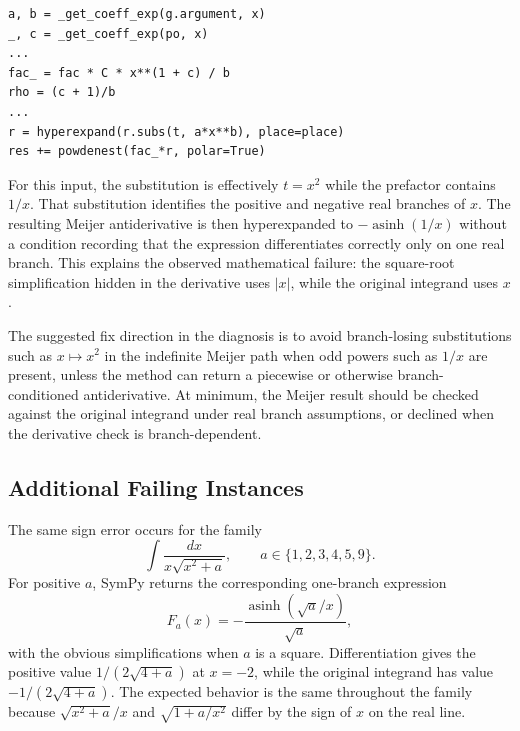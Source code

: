 \documentclass[11pt]{article}
\begin{document}
\begin{lstlisting}[style=bugpython]
a, b = _get_coeff_exp(g.argument, x)
_, c = _get_coeff_exp(po, x)
...
fac_ = fac * C * x**(1 + c) / b
rho = (c + 1)/b
...
r = hyperexpand(r.subs(t, a*x**b), place=place)
res += powdenest(fac_*r, polar=True)
\end{lstlisting}

For this input, the substitution is effectively \(t=x^2\) while the prefactor contains \(1/x\). That substitution identifies the positive and negative real branches of \(x\). The resulting Meijer antiderivative is then hyperexpanded to \(-\operatorname{asinh}(1/x)\) without a condition recording that the expression differentiates correctly only on one real branch. This explains the observed mathematical failure: the square-root simplification hidden in the derivative uses \(|x|\), while the original integrand uses \(x\).

The suggested fix direction in the diagnosis is to avoid branch-losing substitutions such as \(x\mapsto x^2\) in the indefinite Meijer path when odd powers such as \(1/x\) are present, unless the method can return a piecewise or otherwise branch-conditioned antiderivative. At minimum, the Meijer result should be checked against the original integrand under real branch assumptions, or declined when the derivative check is branch-dependent.

\subsection{Additional Failing Instances}

The same sign error occurs for the family
\[
  \int \frac{dx}{x\sqrt{x^2+a}},
  \qquad a\in\{1,2,3,4,5,9\}.
\]
For positive \(a\), SymPy returns the corresponding one-branch expression
\[
  F_a(x)=-\frac{\operatorname{asinh}(\sqrt{a}/x)}{\sqrt{a}},
\]
with the obvious simplifications when \(a\) is a square. Differentiation gives the positive value \(1/(2\sqrt{4+a})\) at \(x=-2\), while the original integrand has value \(-1/(2\sqrt{4+a})\). The expected behavior is the same throughout the family because \(\sqrt{x^2+a}/x\) and \(\sqrt{1+a/x^2}\) differ by the sign of \(x\) on the real line.
\end{document}
